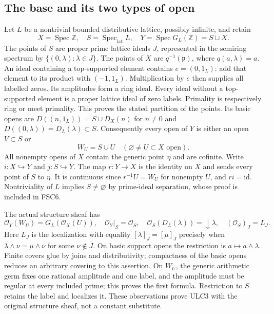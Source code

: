 \documentclass[11pt,a4paper]{article}
\theoremstyle{definition}\newtheorem{definition}[theorem]{Definition}
\begin{document}
\subsection{The base and its two types of open}
Let $L$ be a nontrivial bounded distributive lattice, possibly infinite,
and retain
\begin{equation}\tag{ULC1}
 X=\operatorname{Spec}\mathbb Z,\quad
 S=\operatorname{Spec}_{\mathrm{lat}}L,\quad
 Y=\operatorname{Spec}G_L(\mathbb Z)=S\sqcup X.
\end{equation}
The points of $S$ are proper prime lattice ideals $J$, represented in
the semiring spectrum by $\{(0,\lambda):\lambda\in J\}$. The points
of $X$ are $q^{-1}(\mathfrak p)$, where $q(a,\lambda)=a$.
An ideal containing a top-supported element contains $e=(0,1_L)$:
add that element to its product with $(-1,1_L)$. Multiplication by
$e$ then supplies all labelled zeros. Its amplitudes form a ring
ideal. Every ideal without a top-supported element is a proper lattice
ideal of zero labels. Primality is respectively ring or meet primality.
This proves the stated partition of the points. Its basic opens are
$D((n,1_L))=S\cup D_X(n)$ for $n\ne0$ and
$D((0,\lambda))=D_L(\lambda)\subset S$.
Consequently every open of $Y$ is either an open $V\subset S$ or
\begin{equation}\tag{ULC2}
 W_U=S\cup U\quad(\varnothing\ne U\subset X\text{ open}).
\end{equation}
All nonempty opens of $X$ contain the generic point $\eta$ and are
cofinite. Write $i:X\hookrightarrow Y$ and $j:S\hookrightarrow Y$.
The map $r:Y\to X$ is the identity on $X$ and sends every point of
$S$ to $\eta$. It is continuous since $r^{-1}U=W_U$ for nonempty
$U$, and $ri=\mathrm{id}$. Nontriviality of $L$ implies $S\ne\varnothing$
by prime-ideal separation, whose proof is included in FSC6.

The actual structure sheaf has
\begin{equation}\tag{ULC3}
 \mathcal O_Y(W_U)=G_L(\mathcal O_X(U)),\quad
 \mathcal O_Y|_S=\mathcal O_S,\quad
 \mathcal O_S(D_L(\lambda))=\downarrow\lambda,\quad
 (\mathcal O_S)_J=L_J.
\end{equation}
Here $L_J$ is the localization with equality
$[\lambda]_J=[\mu]_J$ precisely when
$\lambda\wedge\nu=\mu\wedge\nu$ for some $\nu\notin J$.
On basic support opens the restriction is $a\mapsto a\wedge\lambda$.
Finite covers glue by joins and distributivity; compactness of the
basic opens reduces an arbitrary covering to this assertion.
On $W_U$, the generic arithmetic germ fixes one rational amplitude
and one label, and the amplitude must be regular at every included
prime; this proves the first formula. Restriction to $S$ retains
the label and localizes it. These observations prove ULC3 with the
original structure sheaf, not a constant substitute.
\end{document}
